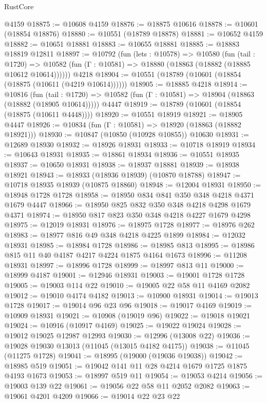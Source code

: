 \begin{lexlean}{RustCore}
\begin{coremodule}
    @4159
@18875 := @10608 @4159
@18876 := @18875 @10616
@18878 := @10601 (@18854 @18876)
@18880 := @10551 (@18789 @18878)
@18881 := @10652 @4159
@18882 := @10651 @18881
@18883 := @10655 @18881
@18885 := @18883 @18819 @12811
@18897 := @10792
    (fun (lets : @10578) =>
    @10580
      (fun (tail : @1720) =>
      @10582 (fun (Γ : @10581) => @18880 (@18863 (@18882 (@18885 @10612 @10614))))))
    @4218
@18904 := @10551 (@18789 (@10601 (@18854 (@18875 (@10611 (@4219 @10614))))))
@18905 := @18885 @4218
@18914 := @10816
    (fun (tail : @1720) => @10582 (fun (Γ : @10581) => @18904 (@18863 (@18882 (@18905 @10614)))))
    @4447
@18919 := @18789 (@10601 (@18854 (@18875 (@10611 @4448))))
@18920 := @10551 @18919
@18921 := @18905 @4447
@18926 := @10834 (fun (Γ : @10581) => @18920 (@18863 (@18882 @18921)))
@18930 := @10847 (@10850 (@10928 @10855)) @10630
@18931 := @12689 @18930
@18932 := @18926 @18931
@18933 := @10718 @18919
@18934 := @10643 @18931
@18935 := @18861 @18934
@18936 := @10551 @18935
@18937 := @10650 @18931
@18938 := @18937 @18881
@18939 := @18938 @18921
@18943 := @18933 (@18936 @18939) (@10870 @18788)
@18947 := @10718 @18935 @18939 (@10875 @18860)
@18948 := @12004 @18931
@18950 := @18948 @1728 @1728
@18958 := @18950 @834 @841 @350 @348 @4218 @4371 @1679 @4447
@18966 := @18950 @825 @832 @350 @348 @4218 @4298 @1679 @4371
@18974 := @18950 @817 @823 @350 @348 @4218 @4227 @1679 @4298
@18975 := @12019 @18931
@18976 := @18975 @1728
@18977 := @18976 @262
@18983 := @18977 @816 @49 @348 @4218 @4225 @1899
@18984 := @12032 @18931
@18985 := @18984 @1728
@18986 := @18985 @813
@18995 := @18986 @815 @11 @40 @4187 @4217 @4224 @1875 @4164 @1673
@18996 := @11208 @18931
@18997 := @18996 @1728
@18999 := @18997 @813 @11
@19000 := @18999 @4187
@19001 := @12946 @18931
@19003 := @19001 @1728 @1728
@19005 := @19003 @114 @22
@19010 := @19005 @22 @58 @11 @4169 @2082
@19012 := @19010 @4174 @4182
@19013 := @10900 @18931
@19014 := @19013 @1728
@19017 := @19014 @96 @23 @96
@19018 := @19017 @4169
@19019 := @10909 @18931
@19021 := @10908 (@19019 @96)
@19022 := @19018 @19021
@19024 := @10916 (@10917 @4169)
@19025 := @19022 @19024
@19028 := @19012 @19025 @12987 @12993
@19030 := @12996 (@13008 @22)
@19036 := @19028 @19030 @13013 (@11045 (@13015 @4182 @4175))
@19038 := @11045 (@11275 @1728)
@19041 := @18995 (@19000 (@19036 @19038))
@19042 := @18985 @519
@19051 := @19042 @141 @11 @28 @4214 @1679 @1725 @1875 @4193 @1673
@19053 := @18997 @519 @11
@19054 := @19053 @4214
@19056 := @19003 @139 @22
@19061 := @19056 @22 @58 @11 @2052 @2082
@19063 := @19061 @4201 @4209
@19066 := @19014 @22 @23 @22

\end{coremodule}
\end{lexlean}
